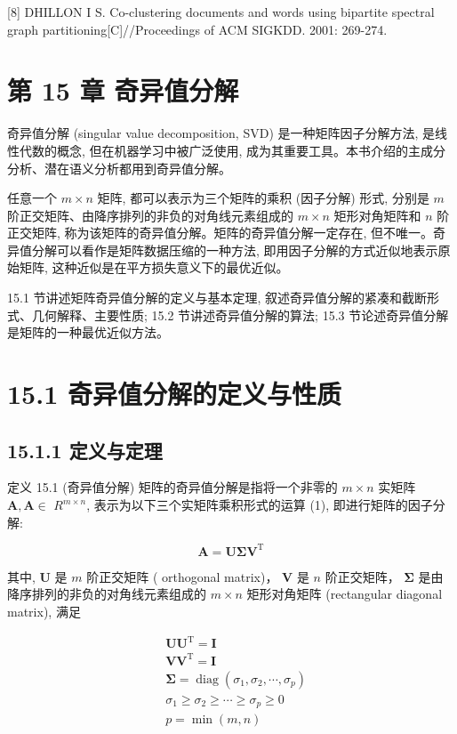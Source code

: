 \documentclass[10pt]{article}
\begin{document}
[8] DHILLON I S. Co-clustering documents and words using bipartite spectral graph partitioning[C]//Proceedings of ACM SIGKDD. 2001: 269-274.

\section*{第 15 章 奇异值分解}
奇异值分解 (singular value decomposition, SVD) 是一种矩阵因子分解方法, 是线性代数的概念, 但在机器学习中被广泛使用, 成为其重要工具。本书介绍的主成分分析、潜在语义分析都用到奇异值分解。

任意一个 $m \times n$ 矩阵, 都可以表示为三个矩阵的乘积 (因子分解) 形式, 分别是 $m$ 阶正交矩阵、由降序排列的非负的对角线元素组成的 $m \times n$ 矩形对角矩阵和 $n$ 阶正交矩阵, 称为该矩阵的奇异值分解。矩阵的奇异值分解一定存在, 但不唯一。奇异值分解可以看作是矩阵数据压缩的一种方法, 即用因子分解的方式近似地表示原始矩阵, 这种近似是在平方损失意义下的最优近似。

15.1 节讲述矩阵奇异值分解的定义与基本定理, 叙述奇异值分解的紧凑和截断形式、几何解释、主要性质; 15.2 节讲述奇异值分解的算法; 15.3 节论述奇异值分解是矩阵的一种最优近似方法。

\section*{15.1 奇异值分解的定义与性质}
\subsection*{15.1.1 定义与定理}
定义 15.1 (奇异值分解) 矩阵的奇异值分解是指将一个非零的 $m \times n$ 实矩阵 $\boldsymbol{A}, \boldsymbol{A} \in$ $R^{m \times n}$, 表示为以下三个实矩阵乘积形式的运算 (1), 即进行矩阵的因子分解:


\begin{equation*}
\boldsymbol{A}=\boldsymbol{U} \boldsymbol{\Sigma} \boldsymbol{V}^{\mathrm{T}} \tag{15.1}
\end{equation*}


其中, $\boldsymbol{U}$ 是 $m$ 阶正交矩阵 ( orthogonal matrix)， $\boldsymbol{V}$ 是 $n$ 阶正交矩阵， $\boldsymbol{\Sigma}$ 是由降序排列的非负的对角线元素组成的 $m \times n$ 矩形对角矩阵 (rectangular diagonal matrix), 满足

$$
\begin{aligned}
& \boldsymbol{U} \boldsymbol{U}^{\mathrm{T}}=\boldsymbol{I} \\
& \boldsymbol{V} \boldsymbol{V}^{\mathrm{T}}=\boldsymbol{I} \\
& \boldsymbol{\Sigma}=\operatorname{diag}\left(\sigma_{1}, \sigma_{2}, \cdots, \sigma_{p}\right) \\
& \sigma_{1} \geqslant \sigma_{2} \geqslant \cdots \geqslant \sigma_{p} \geqslant 0 \\
& p=\min (m, n)
\end{aligned}
$$
\end{document}
